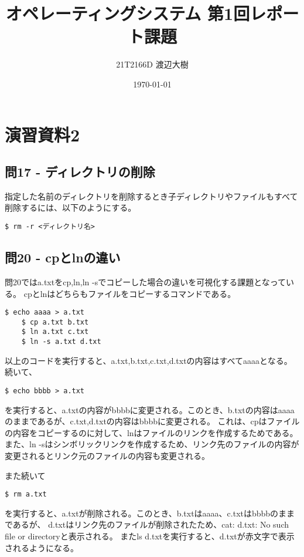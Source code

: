 \documentclass[a4paper,11pt]{jsarticle}
\begin{document}
\title{オペレーティングシステム 第1回レポート課題}
\author{21T2166D 渡辺大樹}
\date{\today}
\maketitle

\section*{演習資料2}

\subsection*{問17 - ディレクトリの削除}
指定した名前のディレクトリを削除するとき子ディレクトリやファイルもすべて削除するには、以下のようにする。
\begin{lstlisting}[caption=問17の解答]
    $ rm -r <ディレクトリ名>
\end{lstlisting}

\subsection*{問20 - cpとlnの違い}
問20ではa.txtをcp,ln,ln -sでコピーした場合の違いを可視化する課題となっている。
cpとlnはどちらもファイルをコピーするコマンドである。
\begin{lstlisting}[caption=問20の解答]
    $ echo aaaa > a.txt
    $ cp a.txt b.txt
    $ ln a.txt c.txt
    $ ln -s a.txt d.txt
\end{lstlisting}
以上のコードを実行すると、a.txt,b.txt,c.txt,d.txtの内容はすべてaaaaとなる。続いて、
\begin{lstlisting}[caption=問20の解答]
    $ echo bbbb > a.txt
\end{lstlisting}
を実行すると、a.txtの内容がbbbbに変更される。このとき、b.txtの内容はaaaaのままであるが、c.txt,d.txtの内容はbbbbに変更される。
これは、cpはファイルの内容をコピーするのに対して、lnはファイルのリンクを作成するためである。
また、ln -sはシンボリックリンクを作成するため、リンク先のファイルの内容が変更されるとリンク元のファイルの内容も変更される。

また続いて
\begin{lstlisting}[caption=問20の解答]
    $ rm a.txt
\end{lstlisting}
を実行すると、a.txtが削除される。このとき、b.txtはaaaa、c.txtはbbbbのままであるが、
d.txtはリンク先のファイルが削除されたため、cat: d.txt: No such file or directoryと表示される。
またls d.txtを実行すると、d.txtが赤文字で表示されるようになる。
\end{document}
